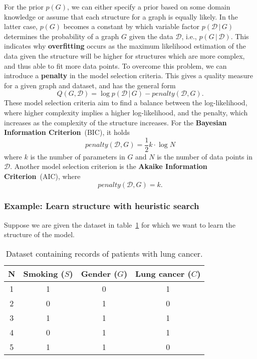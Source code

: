 \documentclass{article}
\newcommand{\giv}{\,|\,}
\begin{document}
For the prior $p(G)$, we can either specify a prior based on some domain knowledge or assume that each structure for a graph is equally likely. In the latter case, $p(G)$ becomes a constant by which variable factor $p(\mathcal{D} \giv G)$ determines the probability of a graph $G$ given the data $\mathcal{D}$, i.e., $p(G \giv \mathcal{D})$. This indicates why \textbf{overfitting} occurs as the maximum likelihood estimation of the data given the structure will be higher for structures which are more complex, and thus able to fit more data points. To overcome this problem, we can introduce a \textbf{penalty} in the model selection criteria. This gives a quality measure for a given graph and dataset, and has the general form
$$
    Q(G, \mathcal{D}) = \log p(\mathcal{D} \giv G) - penalty(\mathcal{D}, G).
$$
\noindent These model selection criteria aim to find a balance between the log-likelihood, where higher complexity implies a higher log-likelihood, and the penalty, which increases as the complexity of the structure increases. For the \textbf{Bayesian Information Criterion}~(BIC), it holds 
$$
    penalty(\mathcal{D}, G) = \frac{1}{2} k \cdot \log N
$$
where $k$ is the number of parameters in $G$ and $N$ is the number of data points in $\mathcal{D}$. Another model selection criterion is the \textbf{Akaike Information Criterion}~(AIC), where 
$$
    penalty(\mathcal{D}, G) = k.
$$

\subsubsection{Example: Learn structure with heuristic search}

Suppose we are given the dataset in table~\ref{tab:struct} for which we want to learn the structure of the model. 

\begin{table}[H]
    \centering
    \caption{Dataset containing records of patients with lung cancer.}\label{tab:struct}
    \vspace{5mm}
    \begin{tabular}{c|ccc}
    \hline
        \textbf{N} & \textbf{Smoking ($S$)} & \textbf{Gender ($G$)} & \textbf{Lung cancer ($C$)} \\ \hline 
        1 & 1 & 0 & 1 \\
        2 & 0 & 1 & 0 \\
        3 & 1 & 1 & 1 \\
        4 & 0 & 1 & 1 \\
        5 & 1 & 1 & 0 \\
        \hline
    \end{tabular}
\end{table}
\end{document}
